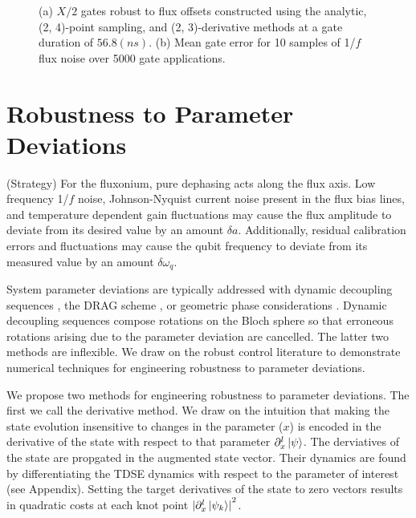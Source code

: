 \documentclass[
  amsfonts,
  amsmath,
  tbtags,
  amssymb,
  aps,
  nobibnotes,
  twocolumn,
]{revtex4-2}
\begin{document}
\begin{figure}[ht]
  
  \caption{\centering
    (a) $X/2$ gates robust to flux offsets constructed using the analytic,
    (2, 4)-point sampling, and (2, 3)-derivative methods at a gate duration
    of $56.8 (ns)$. (b) Mean gate error for 10 samples of 1/$f$ flux noise over 5000
    gate applications.
  }
\end{figure}

\section{Robustness to Parameter Deviations}
(Strategy) For the fluxonium, pure dephasing acts
along the flux axis. Low frequency 1/$f$ noise,
Johnson-Nyquist current noise present in the flux bias
lines, and temperature dependent gain fluctuations
may cause the flux amplitude to deviate from its
desired value by an amount $\delta a$. Additionally,
residual calibration errors and fluctuations may cause
the qubit frequency to deviate from its measured value
by an amount $\delta \omega_{q}$.

System parameter
deviations are typically addressed with dynamic decoupling
sequences \cite{merrill2014progress},
the DRAG scheme \cite{krantz2019quantum}, or
geometric phase considerations
\cite{xu2020nonadiabatic} \cite{han2020experimental}.
Dynamic decoupling sequences compose rotations on the
Bloch sphere so that erroneous rotations arising due
to the parameter deviation are cancelled.
The latter two methods are inflexible. We draw on the
robust control literature to demonstrate
numerical techniques for engineering robustness
to parameter deviations.

We propose two methods for engineering robustness
to parameter deviations. The first we call the
derivative method. We draw on the intuition that
making the state evolution insensitive to changes
in the parameter ($x$) is encoded in the derivative of
the state with respect to that parameter
$\partial_{x}^{l} \ket{\psi}$.
The derviatives of the state are propgated in the
augmented state vector. Their dynamics are found by differentiating
the TDSE dynamics with respect to the parameter of interest
(see Appendix). Setting the target derivatives of the state
to zero vectors results in quadratic costs at each
knot point
${\lvert \partial_{x}^{l} \ket{\psi_{k}} \rvert}^{2}$.
\end{document}
